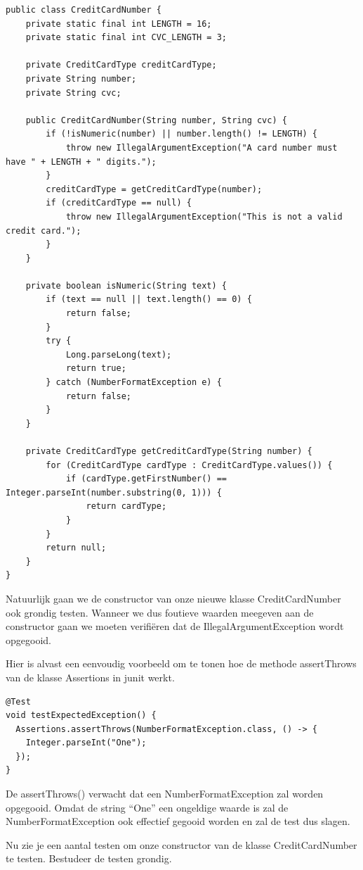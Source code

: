 \begin{lstlisting}
public class CreditCardNumber {
	private static final int LENGTH = 16;
	private static final int CVC_LENGTH = 3;

	private CreditCardType creditCardType;
	private String number;
	private String cvc;

	public CreditCardNumber(String number, String cvc) {
		if (!isNumeric(number) || number.length() != LENGTH) {
			throw new IllegalArgumentException("A card number must have " + LENGTH + " digits.");
		}
		creditCardType = getCreditCardType(number);
		if (creditCardType == null) {
			throw new IllegalArgumentException("This is not a valid credit card.");
		}
	}

	private boolean isNumeric(String text) {
		if (text == null || text.length() == 0) {
			return false;
		}
		try {
			Long.parseLong(text);
			return true;
		} catch (NumberFormatException e) {
			return false;
		}
	}

	private CreditCardType getCreditCardType(String number) {
		for (CreditCardType cardType : CreditCardType.values()) {
			if (cardType.getFirstNumber() == Integer.parseInt(number.substring(0, 1))) {
				return cardType;
			}
		}
		return null;
	}
}
\end{lstlisting} 

Natuurlijk gaan we de constructor van onze nieuwe klasse CreditCardNumber ook grondig testen.  Wanneer we dus foutieve waarden meegeven aan de constructor gaan we moeten verifi\"eren dat de IllegalArgumentException wordt opgegooid.

Hier is alvast een eenvoudig voorbeeld om te tonen hoe de methode assertThrows van de klasse Assertions in junit werkt.

\begin{lstlisting}
@Test
void testExpectedException() {
  Assertions.assertThrows(NumberFormatException.class, () -> {
    Integer.parseInt("One");
  });
}
\end{lstlisting}

De assertThrows() verwacht dat een NumberFormatException zal worden opgegooid. Omdat de string ``One'' een ongeldige waarde is zal de NumberFormatException ook effectief gegooid worden en zal de test dus slagen.

Nu zie je een aantal testen om onze constructor van de klasse CreditCardNumber te testen. Bestudeer de testen grondig.


